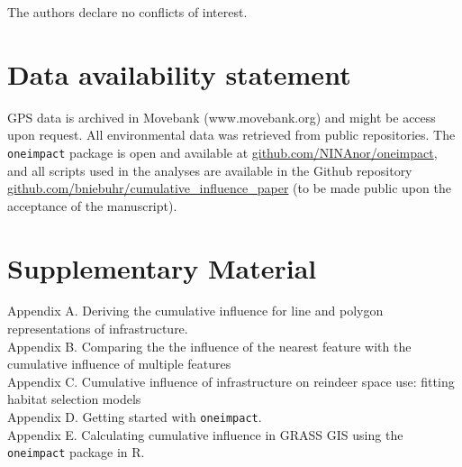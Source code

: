 \documentclass[titlepage]{article}
\begin{document}
The authors declare no conflicts of interest.

\section*{Data availability statement}

GPS data is archived in Movebank (www.movebank.org) and might be access upon request. All environmental data was retrieved from public repositories. The \verb|oneimpact| package is open and available at \url{github.com/NINAnor/oneimpact}, and all scripts used in the analyses are available in the Github repository \url{github.com/bniebuhr/cumulative_influence_paper} (to be made public upon the acceptance of the manuscript).

\section*{Supplementary Material}

Appendix A. Deriving the cumulative influence for line and polygon representations of infrastructure. \\
Appendix B. Comparing the the influence of the nearest feature with the cumulative influence of multiple features \\
Appendix C. Cumulative influence of infrastructure on reindeer space use: fitting habitat selection models \\
Appendix D. Getting started with \verb|oneimpact|. \\
Appendix E. Calculating cumulative influence in GRASS GIS using the \verb|oneimpact| package in R.



\end{document}
